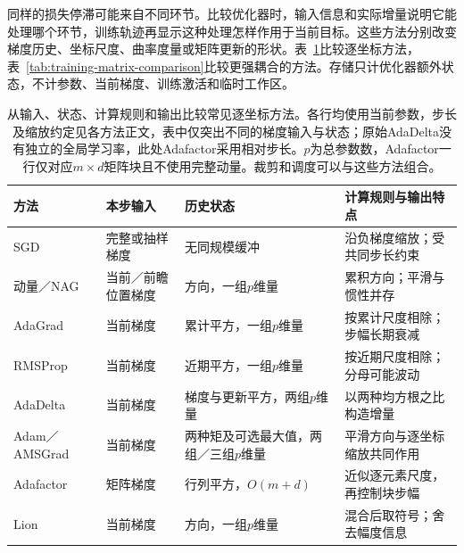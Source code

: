 同样的损失停滞可能来自不同环节。比较优化器时，输入信息和实际增量说明它能处理哪个环节，训练轨迹再显示这种处理怎样作用于当前目标。这些方法分别改变梯度历史、坐标尺度、曲率度量或矩阵更新的形状。表~\ref{tab:training-first-order-comparison}比较逐坐标方法，表~\ref{tab:training-matrix-comparison}比较更强耦合的方法。存储只计优化器额外状态，不计参数、当前梯度、训练激活和临时工作区。
\begin{table}[htbp]
  \centering\small
  \begin{tabularx}{\linewidth}{@{}p{26mm}p{40mm}p{27mm}X@{}}
    \toprule
    方法 & 本步输入 & 历史状态 & 计算规则与输出特点 \\
    \midrule
    SGD & 完整或抽样梯度 & 无同规模缓冲 & 沿负梯度缩放；受共同步长约束 \\
    动量／NAG & 当前／前瞻位置梯度 & 方向，一组$p$维量 & 累积方向；平滑与惯性并存 \\
    AdaGrad & 当前梯度 & 累计平方，一组$p$维量 & 按累计尺度相除；步幅长期衰减 \\
    RMSProp & 当前梯度 & 近期平方，一组$p$维量 & 按近期尺度相除；分母可能波动 \\
    AdaDelta & 当前梯度 & 梯度与更新平方，两组$p$维量 & 以两种均方根之比构造增量 \\
    Adam／AMSGrad & 当前梯度 & 两种矩及可选最大值，两组／三组$p$维量 & 平滑方向与逐坐标缩放共同作用 \\
    Adafactor & 矩阵梯度 & 行列平方，$O(m+d)$ & 近似逐元素尺度，再控制块步幅 \\
    Lion & 当前梯度 & 方向，一组$p$维量 & 混合后取符号；舍去幅度信息 \\
    \bottomrule
  \end{tabularx}
  \caption{从输入、状态、计算规则和输出比较常见逐坐标方法。各行均使用当前参数，步长及缩放约定见各方法正文，表中仅突出不同的梯度输入与状态；原始AdaDelta没有独立的全局学习率，此处Adafactor采用相对步长。$p$为总参数数，Adafactor一行仅对应$m\times d$矩阵块且不使用完整动量。裁剪和调度可以与这些方法组合。}
  \label{tab:training-first-order-comparison}
\end{table}
\FloatBarrier

